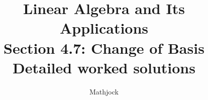 
\title{\textbf{Linear Algebra and Its Applications}\\[0.3em]Section 4.7: Change of Basis\\[0.3em]\large Detailed worked solutions}
\author{Mathjock}
\date{}

\maketitle
\bookinfo
\tableofcontents
\clearpage
\renewcommand{\thesection}{4.\arabic{section}}
\renewcommand{\theHsection}{4.\arabic{section}}
\setcounter{section}{6}



